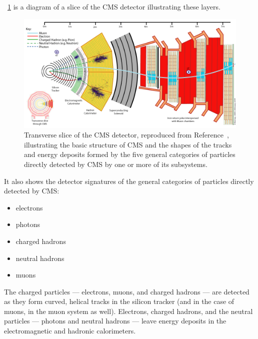\Fig~\ref{cms:interactive} is a diagram of a slice of the CMS detector illustrating these layers.
\begin{figure}[tpb]
  \centering
  \includegraphics[width=\textwidth]{figures/cms/CMSSlice.png}
  \caption[Transverse slice of the CMS detector illustrating the basic structure of CMS and the shapes of the tracks and energy deposits formed by the five general categories of particles directly detected by CMS.]{Transverse slice of the CMS detector, reproduced from Reference~\cite{Davis:2205172}, illustrating the basic structure of CMS and the shapes of the tracks and energy deposits formed by the five general categories of particles directly detected by CMS by one or more of its subsystems.}
  \label{cms:interactive}
\end{figure}
It also shows the detector signatures of the general categories of particles directly detected by CMS:
\begin{itemize}
  \item electrons
  \item photons
  \item charged hadrons
  \item neutral hadrons
  \item muons
\end{itemize}
The charged particles --- electrons, muons, and charged hadrons --- are detected as they form curved, helical tracks in the silicon tracker (and in the case of muons, in the muon system as well).
Electrons, charged hadrons, and the neutral particles --- photons and neutral hadrons --- leave energy deposits in the electromagnetic and hadronic calorimeters.

